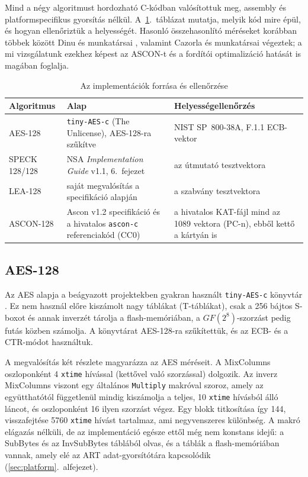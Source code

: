 \documentclass[a4paper,12pt]{report}
\theoremstyle{definition}
\theoremstyle{remark}
\begin{document}
Mind a négy algoritmust hordozható C-kódban valósítottuk meg, assembly és platformspecifikus gyorsítás nélkül. A~\ref{tab:forrasok}.~táblázat mutatja, melyik kód mire épül, és hogyan ellenőriztük a helyességét. Hasonló összehasonlító méréseket korábban többek között Dinu és munkatársai \cite{Dinu2015}, valamint Cazorla és munkatársai \cite{Cazorla2013} végeztek; a mi vizsgálatunk ezekhez képest az ASCON-t és a fordítói optimalizáció hatását is magában foglalja.

\begin{table}[htbp]
    \centering
    \small
    \caption{Az implementációk forrása és ellenőrzése}
    \label{tab:forrasok}
    \begin{tabularx}{\textwidth}{|l|X|X|}
        \hline
        \textbf{Algoritmus} & \textbf{Alap} & \textbf{Helyességellenőrzés} \\ \hline
        AES-128 & \texttt{tiny-AES-c} \cite{TinyAES} (The Unlicense), AES-128-ra szűkítve & NIST SP~800-38A, F.1.1 ECB-vektor \cite{SP80038A} \\ \hline
        SPECK 128/128 & NSA \emph{Implementation Guide} v1.1, 6.~fejezet \cite{Beaulieu2019} & az útmutató tesztvektora \\ \hline
        LEA-128 & saját megvalósítás a specifikáció alapján \cite{Hong2013,Lee2014} & a szabvány tesztvektora \cite{KISALEA} \\ \hline
        ASCON-128 & Ascon v1.2 specifikáció \cite{Dobraunig2021} és a hivatalos \texttt{ascon-c} referenciakód \cite{AsconC} (CC0) & a hivatalos KAT-fájl mind az 1089 vektora (PC-n), ebből kettő a kártyán is \\ \hline
    \end{tabularx}
\end{table}

\subsection{AES-128}

Az AES alapja a beágyazott projektekben gyakran használt \texttt{tiny-AES-c} könyvtár \cite{TinyAES}. Ez nem használ előre kiszámolt nagy táblákat (T-táblákat), csak a 256 bájtos S-boxot és annak inverzét tárolja a flash-memóriában, a $GF(2^8)$-szorzást pedig futás közben számolja. A könyvtárat AES-128-ra szűkítettük, és az ECB- és a CTR-módot használtuk.

A megvalósítás két részlete magyarázza az AES méréseit. A MixColumns oszloponként 4 \texttt{xtime} hívással (kettővel való szorzással) dolgozik. Az inverz MixColumns viszont egy általános \texttt{Multiply} makróval szoroz, amely az együtthatótól függetlenül mindig kiszámolja a teljes, 10 \texttt{xtime} hívásból álló láncot, és oszloponként 16 ilyen szorzást végez. Egy blokk titkosítása így 144, visszafejtése 5760 \texttt{xtime} hívást tartalmaz, ami negyvenszeres különbség. A makró elágazás nélküli, de az implementáció egésze ettől még nem konstans idejű: a SubBytes és az InvSubBytes táblából olvas, és a táblák a flash-memóriában vannak, amely elé az ART adat-gyorsítótára kapcsolódik (\ref{sec:platform}.~alfejezet).
\end{document}
